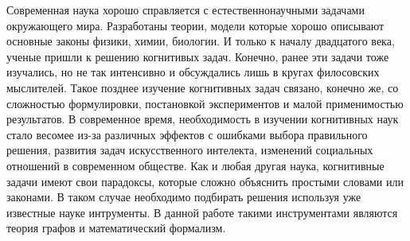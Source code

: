 \intro

Современная наука хорошо справляется с естественнонаучными задачами окружающего мира.
Разработаны теории, модели которые хорошо описывают основные законы физики, химии, биологии.
И только к началу двадцатого века, ученые пришли к решению когнитивых задач.
Конечно, ранее эти задачи тоже изучались, но не так интенсивно и обсуждались лишь в
кругах филосовских мыслителей.
Такое позднее изучение когнитивных задач связано, конечно же, со сложностью формулировки,
постановкой экспериментов и малой применимостью результатов.
В современное время, необходимость в изучении когнитивных наук стало весомее из-за различных
эффектов с ошибками выбора правильного решения, развития задач искусственного интелекта,
изменений социальных отношений в современном обществе.
Как и любая другая наука, когнитивные задачи имеют свои парадоксы, которые сложно объяснить
простыми словами или законами.
В таком случае необходимо подбирать решения используя уже известные науке интрументы.
В данной работе такими инструментами являются теория графов и математический формализм.